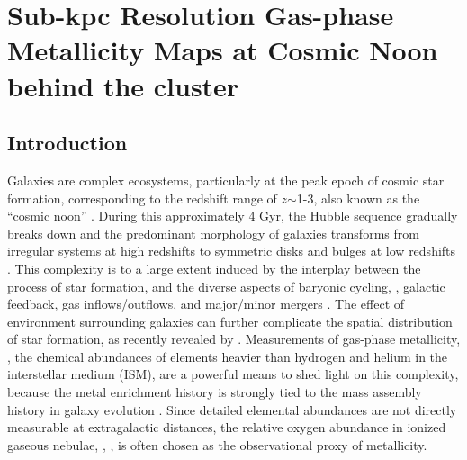 
\chapter{Sub-kpc Resolution Gas-phase Metallicity Maps at Cosmic Noon behind the \protect\hff cluster \clyi}

\section{Introduction}\label{sect:intro}

Galaxies are complex ecosystems, particularly at the peak epoch of cosmic star formation,
corresponding to the redshift range of $z$$\sim$1-3, also known as the ``cosmic noon''
\citep[see][for a recent review]{2014ARA&A..52..415M}.  During this approximately 4 Gyr, the
Hubble sequence gradually breaks down and the predominant morphology of galaxies transforms
from irregular systems at high redshifts to symmetric disks and bulges at low redshifts
\citep{Mortlock:2013dg}.  This complexity is to a large extent induced by the interplay
between the process of star formation, and the diverse aspects of baryonic cycling, \eg,
galactic feedback, gas inflows/outflows, and major/minor mergers
\citep{2011MNRAS.415...11D,Martin:2012dx}.  The effect of environment surrounding galaxies
can further complicate the spatial distribution of star formation, as recently revealed by
\citet{2015ApJ...814..161V}.
Measurements of gas-phase metallicity, \ie, the chemical abundances of elements heavier than
hydrogen and helium in the interstellar medium (ISM), are a powerful means to shed light on
this complexity,
because the metal enrichment history is strongly tied to the mass assembly history in galaxy evolution
\citep{2011MNRAS.416.1354D,Lu:2015ic}.  Since detailed elemental abundances are not directly measurable at extragalactic
distances, the relative oxygen abundance in ionized gaseous nebulae, \ie, \oh, is often chosen as the observational proxy of
metallicity.

